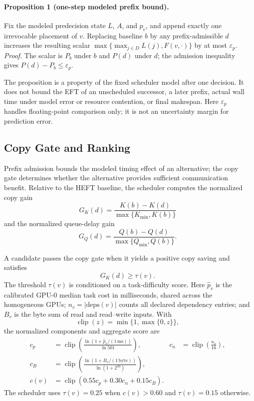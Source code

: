 \documentclass[sigconf]{acmart}
\begin{document}
\paragraph{Proposition 1 (one-step modeled prefix bound).}
Fix the modeled predecision state \(L\), \(A\), and \(p_v\), and append exactly one irrevocable placement of \(v\). Replacing baseline \(b\) by any prefix-admissible \(d\) increases the resulting scalar \(\max\{\max_{j\in D}L(j),F(v,\cdot)\}\) by at most \(\varepsilon_p\).
\emph{Proof.} The scalar is \(P_b\) under \(b\) and \(P(d)\) under \(d\); the admission inequality gives \(P(d)-P_b\le\varepsilon_p\).

The proposition is a property of the fixed scheduler model after one decision. It does not bound the EFT of an unscheduled successor, a later prefix, actual wall time under model error or resource contention, or final makespan. Here \(\varepsilon_p\) handles floating-point comparison only; it is not an uncertainty margin for prediction error.

\subsection{Copy Gate and Ranking}\label{sec:copy-gate}

Prefix admission bounds the modeled timing effect of an alternative; the copy gate determines whether the alternative provides sufficient communication benefit. Relative to the HEFT baseline, the scheduler computes the normalized copy gain
\[
G_K(d)=\frac{K(b)-K(d)}{\max\{K_{\min},K(b)\}}
\]
and the normalized queue-delay gain
\[
G_Q(d)=\frac{Q(b)-Q(d)}{\max\{Q_{\min},Q(b)\}}.
\]

A candidate passes the copy gate when it yields a positive copy saving and satisfies
\[
G_K(d)\ge \tau(v).
\]
The threshold \(\tau(v)\) is conditioned on a task-difficulty score. Here \(\hat p_v\) is the calibrated GPU-0 median task cost in milliseconds, shared across the homogeneous GPUs; \(n_v=|\mathrm{deps}(v)|\) counts all declared dependency entries; and \(B_v\) is the byte sum of read and read--write inputs. With
\[
\operatorname{clip}(z)=\min\{1,\max\{0,z\}\},
\]
the normalized components and aggregate score are
\[
\begin{aligned}
c_p&=\operatorname{clip}\!\left(\frac{\ln(1+\hat p_v/(1\,\mathrm{ms}))}{\ln 501}\right),
&c_n&=\operatorname{clip}\!\left(\frac{n_v}{16}\right),\\
c_B&=\operatorname{clip}\!\left(\frac{\ln(1+B_v/(1\,\mathrm{byte}))}{\ln(1+2^{30})}\right),\\
c(v)&=\operatorname{clip}(0.55c_p+0.30c_n+0.15c_B).
\end{aligned}
\]
The scheduler uses \(\tau(v)=0.25\) when \(c(v)>0.60\) and \(\tau(v)=0.15\) otherwise.
\end{document}
